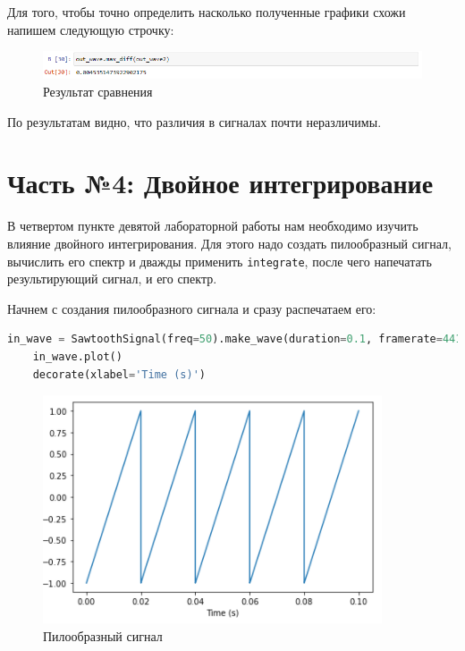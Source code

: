 \documentclass[a4paper]{article}
\begin{document}
            Для того, чтобы точно определить насколько полученные графики схожи напишем следующую строчку:

            \begin{figure}[H]
                \centering
                \includegraphics[width=\textwidth]{ex_3_5.png}
                \caption{Результат сравнения}
                \label{fig:ex_3_5}
            \end{figure}
            
            По результатам видно, что различия в сигналах почти неразличимы.
            
    \newpage
        \section{Часть №4: Двойное интегрирование}
            В четвертом пункте девятой лабораторной работы нам необходимо изучить влияние двойного интегрирования. Для этого надо создать пилообразный сигнал, вычислить его спектр и дважды применить \texttt{integrate}, после чего напечатать результирующий сигнал, и его спектр.
            
            Начнем с создания пилообразного сигнала и сразу распечатаем его:
            
\begin{lstlisting}[language=Python, caption= Создание и вывод пилообразнного сигнала]
    in_wave = SawtoothSignal(freq=50).make_wave(duration=0.1, framerate=44100)
    in_wave.plot()
    decorate(xlabel='Time (s)')
\end{lstlisting}
            
            \begin{figure}[H]
                \centering
                \includegraphics{ex_4_1.png}
                \caption{Пилообразный сигнал}
                \label{fig:ex_4_1}
            \end{figure}
            
\end{document}
